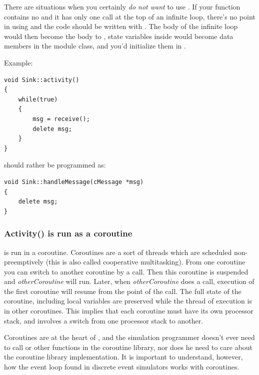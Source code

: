 There are situations when you certainly \textit{do not want} to use .
If your  function contains no  and it has
only one  call at the top of an infinite loop,
there's no point in using  and the code should be written
with .
The body of the infinite loop would then become the body to ,
state variables inside  would become data members in
the module class, and you'd initialize them in .

Example:

\begin{verbatim}
void Sink::activity()
{
    while(true)
    {
        msg = receive();
        delete msg;
    }
}
\end{verbatim}

should rather be programmed as:

\begin{verbatim}
void Sink::handleMessage(cMessage *msg)
{
    delete msg;
}
\end{verbatim}



\subsubsection{Activity() is run as a coroutine}


 is run in a coroutine.
Coroutines are a sort of threads which are scheduled
non-preemptively (this is also called cooperative
multitasking). From one coroutine you
can switch to another coroutine by a
 call. Then this
coroutine is suspended and \textit{otherCoroutine} will run. Later,
when \textit{otherCoroutine} does a
 call, execution of
the first coroutine will resume from the point of the
 call.  The full state
of the coroutine, including local variables are preserved while the
thread of execution is in other coroutines.  This implies that each
coroutine must have its own processor stack, and
 involves a switch from one processor stack to
another.


Coroutines are at the heart of {\opp}, and the
simulation programmer doesn't ever need to call 
or other functions in the coroutine library, nor does he need to care
about the coroutine library implementation. It is important to
understand, however, how the event loop found in discrete event simulators
works with coroutines.


